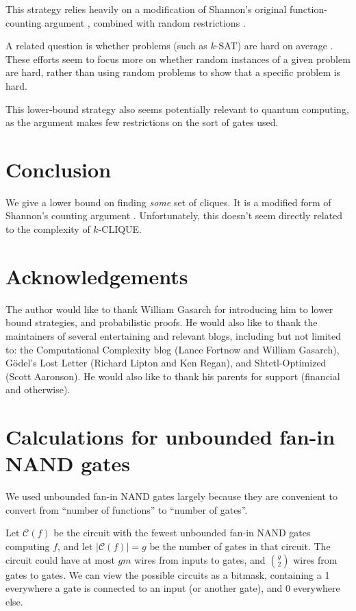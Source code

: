 \documentclass[12pt]{article}
\theoremstyle{definition}
\newcommand{\bigC}[0]{\mathcal{C}}
\begin{document}
This strategy relies heavily on a modification of Shannon's original
function-counting argument \cite{shannon_synthesis_1949},
combined with random restrictions
\cite{subbotovskaya1963comparison} \cite{hastad1987lower}.

A related question is whether problems
(such as $k$-SAT) are
hard on average \cite{bogdanov2006average}.
These efforts seem to focus more on whether
random
instances of a given problem are hard, rather
than using random problems to show that
a specific problem is hard.

This lower-bound strategy also seems potentially
relevant to quantum computing,
as the argument makes few restrictions on the sort of gates used.

\section{Conclusion}

We give a lower bound on finding {\em some} set of cliques.
It is a modified form of Shannon's counting argument
\cite{shannon_synthesis_1949}. Unfortunately,
this doesn't seem directly related to the
complexity of $k$-CLIQUE.

\section{Acknowledgements}

The author would like to thank William Gasarch for introducing him
to lower bound strategies, and probabilistic proofs.
He would also like to thank the maintainers of
several entertaining and relevant blogs, including but
not limited to: the Computational Complexity blog
(Lance Fortnow and William Gasarch), 
G\"odel's Lost Letter (Richard Lipton and Ken Regan),
and Shtetl-Optimized (Scott Aaronson). 
He would also like to thank
his parents for support (financial and otherwise).

\appendix
\section{Calculations for unbounded fan-in NAND gates}
\label{gateMath}

We used unbounded fan-in NAND gates largely because they are
convenient to convert from ``number of functions'' to
``number of gates''.

Let $\bigC(f)$ be the circuit
with the fewest unbounded fan-in NAND
gates computing $f$, and let $|\bigC(f)| = g$ be the number of gates in
that circuit. The
circuit could have at most $gm$ wires from inputs to gates, and ${g \choose 2}$
wires from gates to gates. We can view the possible circuits as a bitmask,
containing a 1 everywhere a gate is connected to an input (or another gate),
and 0 everywhere else.
\end{document}
